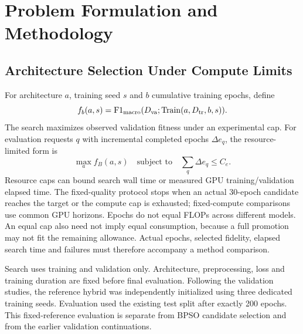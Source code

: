\section{Problem Formulation and Methodology}
\subsection{Architecture Selection Under Compute Limits}
For architecture $a$, training seed $s$ and $b$ cumulative training epochs, define
\begin{equation}
 f_b(a,s)=\mathrm{F1}_{\mathrm{macro}}(D_{\rm va};\operatorname{Train}(a,D_{\rm tr},b,s)).
\end{equation}
The search maximizes observed validation fitness under an experimental cap. For evaluation requests $q$ with incremental completed epochs $\Delta e_q$, the resource-limited form is
\begin{equation}
 \max_a f_B(a,s)\quad\text{subject to}\quad\sum_q\Delta e_q\leq C_e.
\end{equation}
Resource caps can bound search wall time or measured GPU training/validation elapsed time. The fixed-quality protocol stops when an actual 30-epoch candidate reaches the target or the compute cap is exhausted; fixed-compute comparisons use common GPU horizons. Epochs do not equal FLOPs across different models. An equal cap also need not imply equal consumption, because a full promotion may not fit the remaining allowance. Actual epochs, selected fidelity, elapsed search time and failures must therefore accompany a method comparison.

Search uses training and validation only. Architecture, preprocessing, loss and training duration are fixed before final evaluation. Following the validation studies, the reference hybrid was independently initialized using three dedicated training seeds. Evaluation used the existing test split after exactly 200 epochs. This fixed-reference evaluation is separate from BPSO candidate selection and from the earlier validation continuations.

